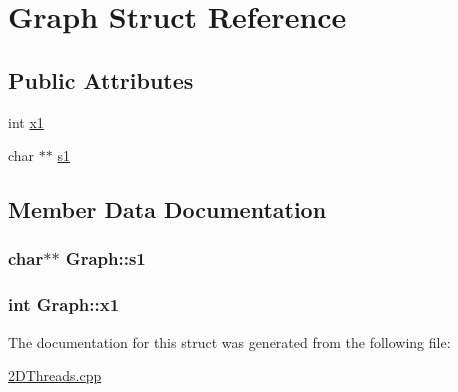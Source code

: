 \hypertarget{structGraph}{\section{Graph Struct Reference}
\label{structGraph}
}
\subsection*{Public Attributes}
\begin{DoxyCompactItemize}
\item 
int \hyperlink{structGraph_a9dd4ae568a6d821eb75f2ed958475090}{x1}
\item 
char $\ast$$\ast$ \hyperlink{structGraph_a7e796504e921c0d9cb144c589f3f48bb}{s1}
\end{DoxyCompactItemize}


\subsection{Member Data Documentation}
\hypertarget{structGraph_a7e796504e921c0d9cb144c589f3f48bb}{
\subsubsection[{s1}]{\setlength{\rightskip}{0pt plus 5cm}char$\ast$$\ast$ Graph\+::s1}}\label{structGraph_a7e796504e921c0d9cb144c589f3f48bb}
\hypertarget{structGraph_a9dd4ae568a6d821eb75f2ed958475090}{
\subsubsection[{x1}]{\setlength{\rightskip}{0pt plus 5cm}int Graph\+::x1}}\label{structGraph_a9dd4ae568a6d821eb75f2ed958475090}


The documentation for this struct was generated from the following file\+:\begin{DoxyCompactItemize}
\item 
\hyperlink{2DThreads_8cpp}{2\+D\+Threads.\+cpp}\end{DoxyCompactItemize}
